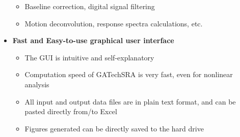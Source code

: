 \documentclass[11pt,letterpaper]{article}
\begin{document}
\begin{itemize}
\begin{itemize}
            \item Baseline correction, digital signal filtering
            \item Motion deconvolution, response spectra calculations, etc.
        \end{itemize}
    \item \textbf{\textsf{Fast and Easy-to-use graphical user interface}}
        \begin{itemize}
            \item The GUI is intuitive and self-explanatory
            \item Computation speed of GATechSRA is very fast, even for nonlinear analysis
            \item All input and output data files are in plain text format, and can be pasted directly from/to Excel
            \item Figures generated can be directly saved to the hard drive
        \end{itemize}
\end{itemize}




\end{document}
